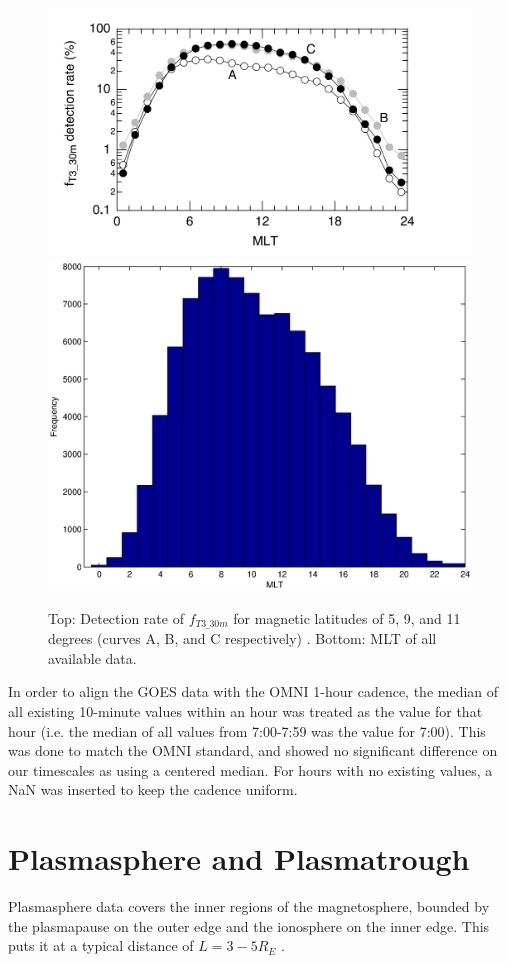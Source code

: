 \begin{figure}[htp!]
	\centering
	\includegraphics[width=0.8\linewidth]{Figures/Takahashi2010Availability.png}
	\includegraphics[width=0.8\linewidth]{Figures/databyMLT}
	\caption{Top: Detection rate of $f_{T3\_30m}$ for magnetic latitudes of 5, 9, and 11 degrees (curves A, B, and C respectively) \citep{Takahashi2010SolarCycleVariation}. Bottom: MLT of all available data.}
	\label{fig:Takahashi2010Availability}
\end{figure}


In order to align the GOES data with the OMNI 1-hour cadence, the median of all existing 10-minute values within an hour was treated as the value for that hour (i.e. the median of all values from 7:00-7:59 was the value for 7:00). This was done to match the OMNI standard, and showed no significant difference on our timescales as using a centered median. For hours with no existing values, a NaN was inserted to keep the cadence uniform. 

\section{Plasmasphere and Plasmatrough}
Plasmasphere data covers the inner regions of the magnetosphere, bounded by the plasmapause on the outer edge and the ionosphere on the inner edge. This puts it at a typical distance of $L=3-5R_E$ \citep{Carpenter1992ISEEModel}. 

